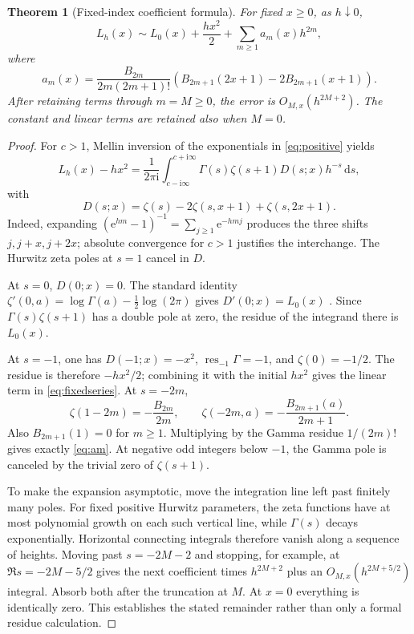 \documentclass[11pt,a4paper]{article}
\numberwithin{equation}{section}
\newtheorem{theorem}{Theorem}[section]
\theoremstyle{definition}
\newcommand{\ii}{\mathrm i}
\newcommand{\ee}{\mathrm e}
\newcommand{\dd}{\,\mathrm d}
\begin{document}
\begin{theorem}[Fixed-index coefficient formula]
\label{thm:coefficients}
For fixed $x\ge0$, as $h\downarrow0$,
\begin{equation}
L_h(x)\sim L_0(x)+\frac{hx^2}{2}
                   +\sum_{m\ge1}a_m(x)h^{2m},
\label{eq:fixedseries}
\end{equation}
where
\begin{equation}
\boxed{\displaystyle
a_m(x)=\frac{B_{2m}}{2m(2m+1)!}
 \left(B_{2m+1}(2x+1)-2B_{2m+1}(x+1)\right).}
\label{eq:am}
\end{equation}
After retaining terms through $m=M\ge0$, the error is $O_{M,x}(h^{2M+2})$. The constant and linear terms are retained also when $M=0$.
\end{theorem}
\begin{proof}
For $c>1$, Mellin inversion of the exponentials in \eqref{eq:positive} yields
\begin{equation}
L_h(x)-hx^2=\frac1{2\pi\ii}\int_{c-\ii\infty}^{c+\ii\infty}
 \Gamma(s)\zeta(s+1)D(s;x)h^{-s}\dd s,
\label{eq:Mellin}
\end{equation}
with
\[
D(s;x)=\zeta(s)-2\zeta(s,x+1)+\zeta(s,2x+1).
\]
Indeed, expanding $(\ee^{hm}-1)^{-1}=\sum_{j\ge1}\ee^{-hmj}$ produces the three shifts $j,j+x,j+2x$; absolute convergence for $c>1$ justifies the interchange. The Hurwitz zeta poles at $s=1$ cancel in $D$.

At $s=0$, $D(0;x)=0$. The standard identity
$\zeta'(0,a)=\log\Gamma(a)-\tfrac12\log(2\pi)$ gives $D'(0;x)=L_0(x)$ \cite{dlmfhurwitz}. Since $\Gamma(s)\zeta(s+1)$ has a double pole at zero, the residue of the integrand there is $L_0(x)$.

At $s=-1$, one has $D(-1;x)=-x^2$, $\operatorname{res}_{-1}\Gamma=-1$, and $\zeta(0)=-1/2$. The residue is therefore $-hx^2/2$; combining it with the initial $hx^2$ gives the linear term in \eqref{eq:fixedseries}. At $s=-2m$,
\[
\zeta(1-2m)=-\frac{B_{2m}}{2m},\qquad
\zeta(-2m,a)=-\frac{B_{2m+1}(a)}{2m+1}.
\]
Also $B_{2m+1}(1)=0$ for $m\ge1$. Multiplying by the Gamma residue $1/(2m)!$ gives exactly \eqref{eq:am}. At negative odd integers below $-1$, the Gamma pole is canceled by the trivial zero of $\zeta(s+1)$.

To make the expansion asymptotic, move the integration line left past finitely many poles. For fixed positive Hurwitz parameters, the zeta functions have at most polynomial growth on each such vertical line, while $\Gamma(s)$ decays exponentially. Horizontal connecting integrals therefore vanish along a sequence of heights. Moving past $s=-2M-2$ and stopping, for example, at $\Re s=-2M-5/2$ gives the next coefficient times $h^{2M+2}$ plus an $O_{M,x}(h^{2M+5/2})$ integral. Absorb both after the truncation at $M$. At $x=0$ everything is identically zero. This establishes the stated remainder rather than only a formal residue calculation.
\end{proof}
\end{document}
